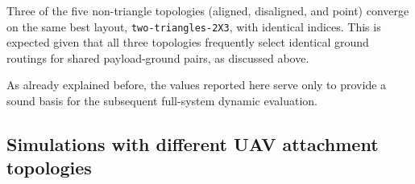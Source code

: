 Three of the five non-triangle topologies (aligned, disaligned, and point) converge on the same best layout, \texttt{two-triangles-2X3}, with identical indices. This is expected given that all three topologies frequently select identical ground routings for shared payload-ground pairs, as discussed above.

\begin{table}[htbp]
\centering
\begin{threeparttable}
\small
{}
\caption{Best-scoring layout obtained during ground screening for each UAV
attachment topology.}
\label{tab:pre-screening_by_topology}
\end{threeparttable}
\end{table}

As already explained before, the values reported here serve only to provide a sound basis for the subsequent full-system dynamic evaluation.
\subsection{Simulations with different UAV attachment topologies}
